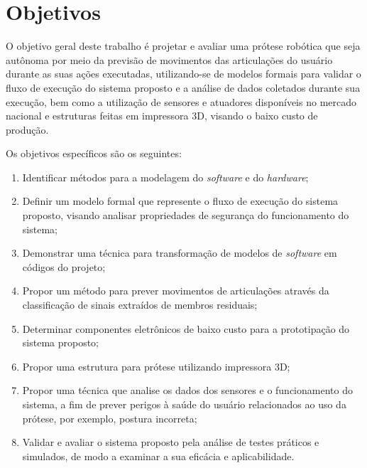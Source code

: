 \section{Objetivos}\label{sec:objetivos}

O objetivo geral deste trabalho é projetar e avaliar uma prótese robótica que seja autônoma por meio da previsão de movimentos das articulações do usuário durante as suas ações executadas, utilizando-se de modelos formais para validar o fluxo de execução do sistema proposto e a análise de dados coletados durante sua execução, bem como a utilização de sensores e atuadores disponíveis no mercado nacional e estruturas feitas em impressora 3D, visando o baixo custo de produção.


Os objetivos específicos são os seguintes:
\begin{enumerate}
  \item Identificar métodos para a modelagem do \textit{software} e do \textit{hardware};
  \item Definir um modelo formal que represente o fluxo de execução do sistema proposto, visando analisar propriedades de segurança do funcionamento do sistema;
  \item Demonstrar uma técnica para transformação de modelos de \textit{software} em códigos do projeto;
  \item Propor um método para prever movimentos de articulações através da classificação de sinais extraídos de membros residuais;
  \item Determinar componentes eletrônicos de baixo custo para a prototipação do sistema proposto;
  \item Propor uma estrutura para prótese utilizando impressora 3D\@;
  \item Propor uma técnica que analise os dados dos sensores e o funcionamento do sistema, a fim de prever perigos à saúde do usuário relacionados ao uso da prótese, por exemplo, postura incorreta;
  \item Validar e avaliar o sistema proposto pela análise de testes práticos e simulados, de modo a examinar a sua eficácia e aplicabilidade.
\end{enumerate}

